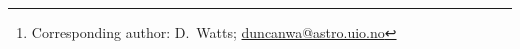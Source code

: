 \newcommand{\oslo}[0]{1}
\newcommand{\iiabangalore}[0]{2}

\author{\small
D.~Watts\inst{\oslo}\thanks{Corresponding author: D.~Watts; \url{duncanwa@astro.uio.no}}
\and
U.~Fuskeland\inst{\oslo}
et al.
}
